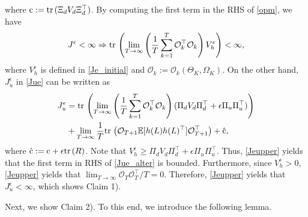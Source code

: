 \documentclass[preprint,5p,times,twocolumn]{elsarticle}
\def\tr{{\rm tr} \hspace{0.5mm}}
\begin{document}
where ${\rm c} := \tr(\Xi_dV_d\Xi_d^{\top})$. By computing the first term in the RHS of \eqref{opm}, we have 
\begin{align}
    J^{\epsilon} < \infty \Rightarrow \tr\left(\lim_{T\to\infty}\left(\frac{1}{T}\sum_{k=1}^{T}\mathcal O_k^{\top}\mathcal O_k\right)V_h^{\epsilon}\right) < \infty, \label{Jeupper}
\end{align}
where $V_h^{\epsilon}$ is defined in \eqref{Je_initial} and $\mathcal O_k := \mathcal O_k(\Theta_K, \Omega_K)$. On the other hand, $J_u^{\epsilon}$ in \eqref{Jue} can be written as 
\begin{align}
    J_u^{\epsilon} &= \tr\left(\lim_{T\to\infty}\left(\frac{1}{T}\sum_{k=1}^{T}\mathcal O_k^{\top}\mathcal O_k\right)(\Pi_dV_d\Pi_d^{\top} + \epsilon \Pi_u\Pi_u^{\top})\right) \nonumber \\
    & + \lim_{T\to\infty}\frac{1}{T}\tr\left(\mathcal O_{T+1}\mathbb E[h(L)h(L)^{\top}]\mathcal O_{T+1}^{\top}\right) + \hat{\rm c}, \label{Jue_alter}
\end{align}
where $\hat{\rm c} := {\rm c} + \epsilon \tr(R)$. 
Note that $V_h^{\epsilon} \geq \Pi_dV_d\Pi_d^{\top} + \epsilon \Pi_u\Pi_u^{\top}$. Thus, \eqref{Jeupper} yields that the first term in RHS of \eqref{Jue_alter} is bounded. Furthermore, since $V_h^{\epsilon} > 0$,  \eqref{Jeupper} yields that $\lim_{T \to\infty}\mathcal O_{T}\mathcal O_{T}^{\top}/T = 0$. Therefore, \eqref{Jeupper} yields that $J_{u}^{\epsilon} < \infty$, which shows Claim 1). 

Next, we show Claim 2). To this end, we introduce the following lemma. 
\end{document}

